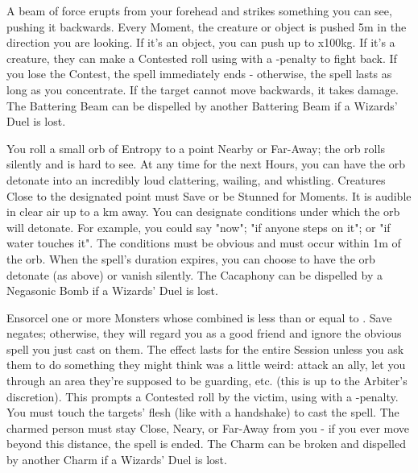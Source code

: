 {A beam of force erupts from your forehead and strikes something you can see,
pushing it backwards. Every Moment, the creature or object is pushed 5m in
the direction you are looking.  If it's an object, you can push up to \DICE
x100kg.  If it's a creature, they can make a Contested roll using \VIG with
a -\DICE penalty to fight back. If you lose the Contest, the spell
immediately ends - otherwise, the spell lasts as long as you concentrate. 
If the target cannot move backwards, it takes \DICE damage.  The Battering
Beam can be dispelled by another Battering Beam if a Wizards' Duel is lost.




\SPELL[
  Name=Cacaphony,
  Link=wizardry-cacaphony,
  Paradigm=Entropy,
  Save=Y (negate),
  Duration=Varies,
  Counter=\mylink{Negasonic Bomb}{wizardry-negasonic-bomb} ,
  Keywords=None,
  Target=Nearby or Far-Away point
]



You roll a small orb of Entropy to a point Nearby or Far-Away; the orb rolls
silently and is hard to see.  At any time for the next \SUMDICE Hours, you
can have the orb detonate into an incredibly loud clattering, wailing, and
whistling. Creatures Close to the designated point must Save or be Stunned
for \DICE Moments. It is audible in clear air up to a \DICE km away. You can
designate \DICE conditions under which the orb will detonate. For example,
you could say "now"; "if anyone steps on it"; or "if water touches it".  The
conditions must be obvious and must occur within 1m of the orb. When the
spell's duration expires, you can choose to have the orb detonate (as above)
or vanish silently.  The Cacaphony can be dispelled by a Negasonic Bomb if a
Wizards' Duel is lost.





\SPELL[
  Name=Charm,
  Link=wizardry-charm,
  Paradigm=Mind,
  Save=Y (negate),
  Duration=Session,
  Counter=\mylink{Charm}{wizardry-charm} ,
  Keywords=Contested,
  Target=Close Monster(s)
]



Ensorcel one or more Monsters whose combined \HD is less than or equal to
\DICE.  Save negates; otherwise, they will regard you as a good friend and
ignore the obvious spell you just cast on them.  The effect lasts for the
entire Session unless you ask them to do something they might think was a
little weird: attack an ally, let you through an area they're supposed to be
guarding, etc. (this is up to the Arbiter's discretion).  This prompts a
Contested roll by the victim, using \FOC with a -\DICE penalty.  You must
touch the targets' flesh (like with a handshake) to cast the spell.  The
charmed person must stay Close, Neary, or Far-Away from you - if you ever
move beyond this distance, the spell is ended.  The Charm can be broken and
dispelled by another Charm if a Wizards' Duel is lost. 




}
